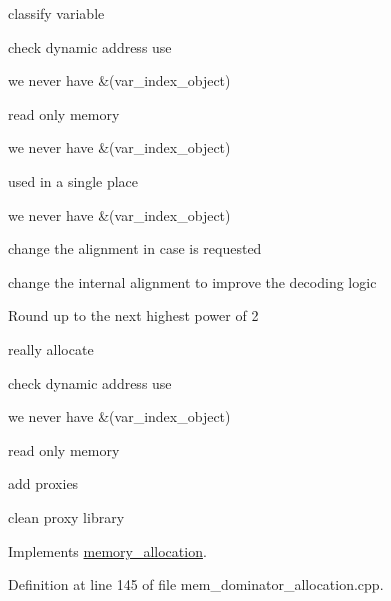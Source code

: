classify variable

check dynamic address use

we never have \&(var\+\_\+index\+\_\+object)

read only memory

we never have \&(var\+\_\+index\+\_\+object)

used in a single place

we never have \&(var\+\_\+index\+\_\+object)

change the alignment in case is requested

change the internal alignment to improve the decoding logic

Round up to the next highest power of 2

really allocate

check dynamic address use

we never have \&(var\+\_\+index\+\_\+object)

read only memory

add proxies

clean proxy library 

Implements \hyperlink{classmemory__allocation_a7d2e79df1dbef9bc6682ca310eb408d5}{memory\+\_\+allocation}.



Definition at line 145 of file mem\+\_\+dominator\+\_\+allocation.\+cpp.



